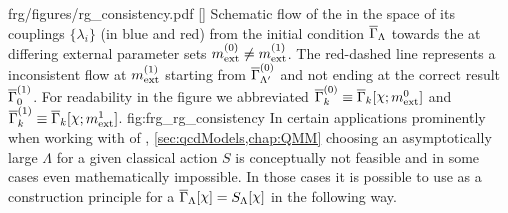 \fullWidthFigure%
	{frg/figures/rg_consistency.pdf}%
	[]%
	{%
		Schematic \frg{} flow \dash{} \rgscaleevolution{} of the \eaa{} in the space of its couplings $\{\lambda_i\}$ \dash{} (in blue and red) from the \uv{} initial condition $\overline{\Gamma}_\Lambda$ towards the \ir{} at differing external parameter sets $m_{\mathrm{ext}}^{(0)}\neq m_{\mathrm{ext}}^{(1)}$.
		The red-dashed line represents a \rg{} inconsistent flow at $m_{\mathrm{ext}}^{(1)}$ starting from $\overline{\Gamma}_{\Lambda'}^{(0)}$ and not ending at the correct \ir{} result $\overline{\Gamma}_{0}^{(1)}$.
		For readability in the figure we abbreviated $\FSeaa_k^{(0)}\equiv\FSeaa_k[\FSsf;m_\ext^0]$ and $\FSeaa_k^{(1)}\equiv\FSeaa_k[\FSsf;m_\ext^1]$.%
	}%
	{fig:frg_rg_consistency}%
In certain applications \dash{} prominently when working with \loefts{} of \qcd{}, \cf{} \cref{sec:qcdModels,chap:QMM} \dash{} choosing an asymptotically large $\Lambda$ for a given classical action $S$ is conceptually not feasible and in some cases even mathematically impossible.
In those cases it is possible to use \rgcy{} as a construction principle for a \rgscaledependent{} \ic{} $\FSeaa_\Lambda[\FSsf]=S_\Lambda[\FSsf]$ in the following way.

